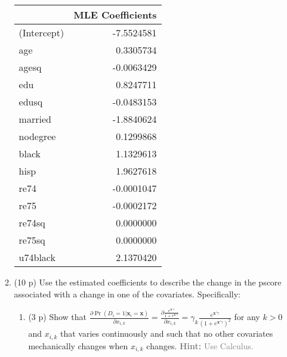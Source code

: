 \documentclass[
]{article}
\newenvironment{Shaded}{\begin{snugshade}}{\end{snugshade}}
\newcommand{\AttributeTok}[1]{\textcolor[rgb]{0.13,0.29,0.53}{#1}}
\newcommand{\FunctionTok}[1]{\textcolor[rgb]{0.13,0.29,0.53}{\textbf{#1}}}
\newcommand{\NormalTok}[1]{#1}
\newcommand{\OtherTok}[1]{\textcolor[rgb]{0.56,0.35,0.01}{#1}}
\newcommand{\SpecialCharTok}[1]{\textcolor[rgb]{0.81,0.36,0.00}{\textbf{#1}}}
\newcommand{\StringTok}[1]{\textcolor[rgb]{0.31,0.60,0.02}{#1}}
\begin{document}
\begin{enumerate}
\begin{enumerate}
\begin{Shaded}
\end{Shaded}

    \begin{longtable}[]{@{}lr@{}}
    \toprule\noalign{}
    & MLE Coefficients \\
    \midrule\noalign{}
    \endhead
    \bottomrule\noalign{}
    \endlastfoot
    (Intercept) & -7.5524581 \\
    age & 0.3305734 \\
    agesq & -0.0063429 \\
    edu & 0.8247711 \\
    edusq & -0.0483153 \\
    married & -1.8840624 \\
    nodegree & 0.1299868 \\
    black & 1.1329613 \\
    hisp & 1.9627618 \\
    re74 & -0.0001047 \\
    re75 & -0.0002172 \\
    re74sq & 0.0000000 \\
    re75sq & 0.0000000 \\
    u74black & 2.1370420 \\
    \end{longtable}
  \item
    (10 p) Use the estimated coefficients to describe the change in the
    pscore associated with a change in one of the covariates.
    Specifically:

    \begin{enumerate}
    \def\labelenumiii{\roman{enumiii}.}
    \item
      (3 p) Show that
      \(\frac{\partial \Pr(D_i=1|\mathbf{x}_{i}=\mathbf{x})}{\partial x_{i,k}}=\frac{\partial \frac{e^{\mathbf{x}'\gamma}}{1+ e^{\mathbf{x}'\gamma}}}{\partial x_{i,k}}= \gamma_k \frac{e^{\mathbf{x}'\gamma}}{(1+e^{\mathbf{x}'\gamma})^2}\)
      for any \(k >0\) and \(x_{i,k}\) that varies continuously and such
      that no other covariates mechanically changes when \(x_{i,k}\)
      changes.
      \textcolor{gray}{\textbf{Hint:} Use Calculus.}\label{item:logit:partial}


\end{enumerate}
\end{enumerate}
\end{enumerate}
\end{document}
